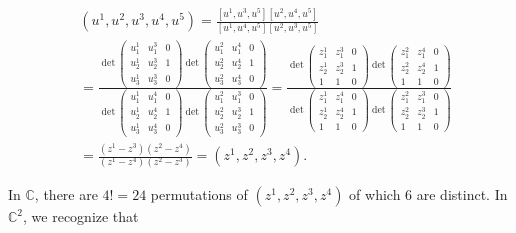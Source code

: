 \documentclass{amsart}
\theoremstyle{theorem}
\theoremstyle{lemma}
\theoremstyle{definition}
\begin{document}
\begin{align*}
&(u^1, u^2, u^3, u^4, u^5)=\frac{[u^1, u^3, u^5][u^2, u^4, u^5]}{[u^1, u^4, u^5][u^2, u^3, u^5]}\\
&=\frac{ \det\begin{pmatrix}
    u^1_1 & u^3_1 & 0 \\
    u^1_2 & u^3_2 & 1 \\
    u^1_3 & u^3_3 & 0
\end{pmatrix}\det\begin{pmatrix}
    u^2_1 & u^4_1 & 0 \\
    u^2_2 & u^4_2 & 1 \\
    u^2_3 & u^4_3 & 0
\end{pmatrix}}
{\det\begin{pmatrix}
    u^1_1 & u^4_1 & 0 \\
    u^1_2 & u^4_2 & 1 \\
    u^1_3 & u^4_3 & 0
\end{pmatrix}\det\begin{pmatrix}
    u^2_1 & u^3_1 & 0 \\
    u^2_2 & u^3_2 & 1 \\
    u^2_3 & u^3_3 & 0
\end{pmatrix}}
=\frac{ \det\begin{pmatrix}
    z^1_1 & z^3_1 & 0 \\
    z^1_2 & z^3_2 & 1 \\
    1 & 1 & 0
\end{pmatrix}\det\begin{pmatrix}
   z^2_1 & z^4_1 & 0 \\
    z^2_2 & z^4_2 & 1 \\
    1 & 1 & 0
\end{pmatrix}}
{\det\begin{pmatrix}
   z^1_1 & z^4_1 & 0 \\
    z^1_2 & z^4_2 & 1 \\
    1 & 1 & 0
\end{pmatrix}\det\begin{pmatrix}
    z^2_1 & z^3_1 & 0 \\
    z^2_2 & z^3_2 & 1 \\
    1 & 1 & 0
\end{pmatrix}}\\
&=\frac{(z^1-z^3)(z^2-z^4)}{(z^1-z^4)(z^2-z^3)}=(z^1, z^2 , z^3, z^4).
\end{align*}

In $\mathbb{C}$, there are $4!=24$ permutations of $(z^1, z^2, z^3, z^4)$ of which $6$ are distinct. In $\mathbb{C}^2$, we recognize that 
\end{document}
